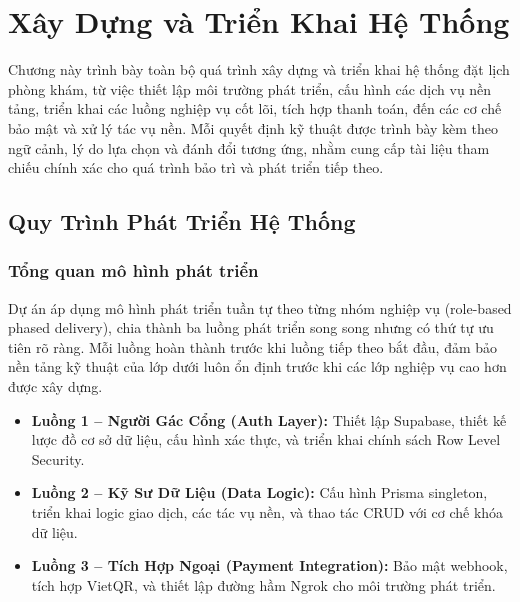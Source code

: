 \documentclass[14pt,a4paper]{report}
\begin{document}

\chapter{Xây Dựng và Triển Khai Hệ Thống}

Chương này trình bày toàn bộ quá trình xây dựng và triển khai hệ thống
đặt lịch phòng khám, từ việc thiết lập môi trường phát triển, cấu hình
các dịch vụ nền tảng, triển khai các luồng nghiệp vụ cốt lõi, tích hợp
thanh toán, đến các cơ chế bảo mật và xử lý tác vụ nền. Mỗi quyết định
kỹ thuật được trình bày kèm theo ngữ cảnh, lý do lựa chọn và đánh đổi
tương ứng, nhằm cung cấp tài liệu tham chiếu chính xác cho quá trình
bảo trì và phát triển tiếp theo.

\section{Quy Trình Phát Triển Hệ Thống}

\subsection{Tổng quan mô hình phát triển}

Dự án áp dụng mô hình phát triển tuần tự theo từng nhóm nghiệp vụ
(role-based phased delivery), chia thành ba luồng phát triển song song
nhưng có thứ tự ưu tiên rõ ràng. Mỗi luồng hoàn thành trước khi luồng
tiếp theo bắt đầu, đảm bảo nền tảng kỹ thuật của lớp dưới luôn ổn định
trước khi các lớp nghiệp vụ cao hơn được xây dựng.

\begin{itemize}
    \item \textbf{Luồng 1 -- Người Gác Cổng (Auth Layer):} Thiết lập
          Supabase, thiết kế lược đồ cơ sở dữ liệu, cấu hình
          xác thực, và triển khai chính sách Row Level Security.
    \item \textbf{Luồng 2 -- Kỹ Sư Dữ Liệu (Data Logic):} Cấu hình
          Prisma singleton, triển khai logic giao dịch, các tác vụ nền,
          và thao tác CRUD với cơ chế khóa dữ liệu.
    \item \textbf{Luồng 3 -- Tích Hợp Ngoại (Payment Integration):}
          Bảo mật webhook, tích hợp VietQR, và thiết lập đường hầm
          Ngrok cho môi trường phát triển.
\end{itemize}
\end{document}
